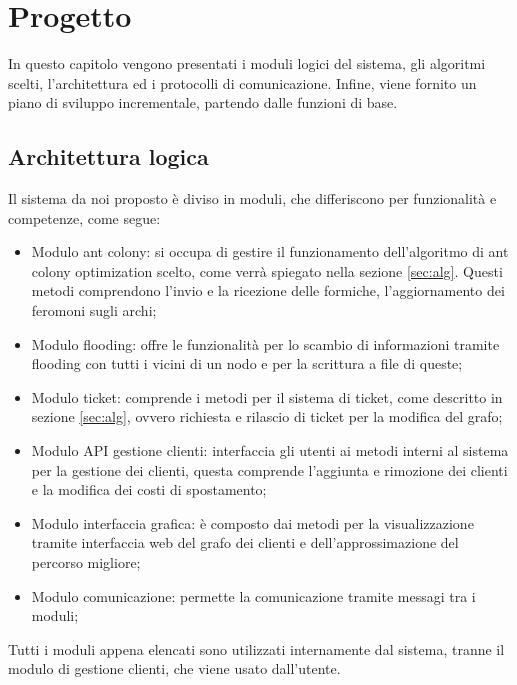 \chapter{Progetto}


In questo capitolo vengono presentati i moduli logici del sistema, gli algoritmi scelti, l'architettura ed i protocolli di comunicazione.
Infine, viene fornito un piano di sviluppo incrementale, partendo dalle funzioni di base.

\section{Architettura logica}\label{sec:archit}
Il sistema da noi proposto è diviso in moduli, che differiscono per funzionalità e competenze, come segue:
\begin{itemize}
    \item Modulo ant colony: si occupa di gestire il funzionamento dell'algoritmo di ant colony optimization scelto, come verrà spiegato nella sezione \ref{sec:alg}. Questi metodi comprendono
    l'invio e la ricezione delle formiche, l'aggiornamento dei feromoni sugli archi;
    \item Modulo flooding: offre le funzionalità per lo scambio di informazioni tramite flooding con tutti i vicini di un nodo e per la scrittura a file di queste;
    \item Modulo ticket: comprende i metodi per il sistema di ticket, come descritto in sezione \ref{sec:alg}, ovvero richiesta e rilascio di ticket per la modifica del grafo;
    \item Modulo API gestione clienti: interfaccia gli utenti ai metodi interni al sistema per la gestione dei clienti, questa comprende l'aggiunta e rimozione dei clienti e la modifica dei costi di spostamento;
    \item Modulo interfaccia grafica: è composto dai metodi per la visualizzazione tramite interfaccia web del grafo dei clienti e dell'approssimazione del percorso migliore;
    \item Modulo comunicazione: permette la comunicazione tramite messagi tra i moduli;
\end{itemize}
Tutti i moduli appena elencati sono utilizzati internamente dal sistema, tranne il modulo di gestione clienti, che viene usato dall'utente.

